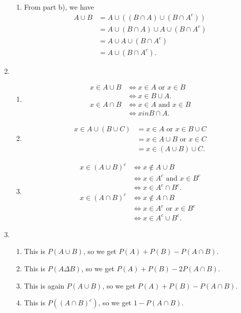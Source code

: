\documentclass{article}
\begin{document}
\begin{enumerate}
\begin{enumerate}
        \item From part b), we have \begin{align*}
            A \cup B
            &= A \cup ((B \cap A) \cup (B \cap A^c)) \\
            &= A \cup (B \cap A) \cup A \cup (B \cap A^c) \\
            &= A \cup A \cup (B \cap A^c) \\
            &= A \cup (B \cap A^c).
        \end{align*}
    \end{enumerate}

    \item \begin{enumerate}
        \item \begin{align*}
            x \in A \cup B 
            &\iff x \in A \text{ or } x \in B \\
            &\iff x \in B \cup A. \\
            x \in A \cap B
            &\iff x \in A \text{ and } x \in B \\
            &\iff x in B \cap A.
        \end{align*}

        \item \begin{align*}
            x \in A \cup (B \cup C) 
            &= x \in A \text{ or } x \in B \cup C \\
            &= x \in A \cup B \text{ or } x \in C \\
            &= x \in (A \cup B) \cup C.
        \end{align*}

        \item \begin{align*}
            x \in (A \cup B)^{c}
            &\iff x \notin A \cup B \\
            &\iff x \in A^c \text{ and } x \in B^c \\
            &\iff x \in A^c \cap B^c. \\
            x \in (A \cap B)^c
            &\iff x \notin A \cap B \\
            &\iff x \in A^c \text{ or } x \in B^c \\
            &\iff x \in A^c \cup B^c.
        \end{align*}
    \end{enumerate}

    \item \begin{enumerate}
        \item This is $P(A \cup B)$, so we get $P(A) + P(B) - P(A \cap B)$.
        \item This is $P(A \Delta B)$, so we get $P(A) + P(B) - 2P(A \cap B)$.
        \item This is again $P(A \cup B)$, so we get $P(A) + P(B) - P(A \cap B)$.
        \item This is $P((A \cap B)^c)$, so we get $1 - P(A \cap B)$.
    \end{enumerate}


\end{enumerate}
\end{document}
